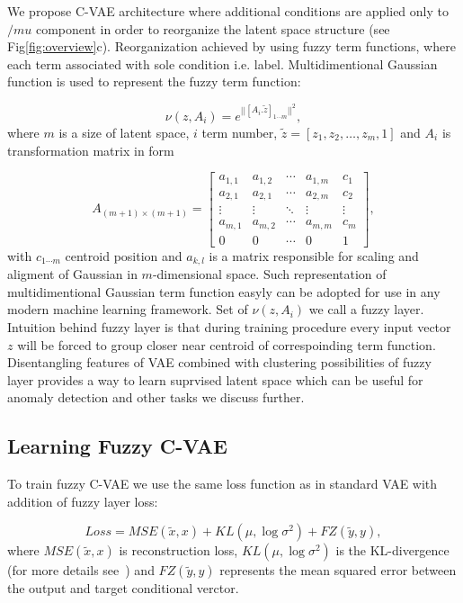 \documentclass[runningheads]{llncs}
\begin{document}
We propose C-VAE architecture where additional conditions are applied only to $/mu$ component in order to reorganize the latent space structure (see Fig\ref{fig:overview}c).
Reorganization achieved by using fuzzy term functions, where each term associated with sole condition i.e. label.
Multidimentional Gaussian function is used to represent the fuzzy term function:

\[ 
   \nu(z, A_i) = e^{|| [A_i . \tilde{z}]_{1 \cdots m} ||^2},
\]
where $m$ is a size of latent space, $i$ \- term number, $\tilde{z} = [z_1, z_2, \ldots, z_m, 1]$ and $A_i$ is transformation matrix in form 

\[ 
    A_{(m+1) \times (m+1)}= 
    \begin{bmatrix}
        a_{1,1} & a_{1,2} & \cdots & a_{1,m} & c_{1}\\
        a_{2,1} & a_{2,1} & \cdots & a_{2,m} & c_{2}\\
        \vdots & \vdots & \ddots & \vdots & \vdots \\
        a_{m,1} & a_{m,2} & \cdots & a_{m,m} & c_{m}\\
        0 & 0 & \cdots & 0 & 1
    \end{bmatrix},
\]
with $c_{1\cdots m}$ centroid position and $a_{k,l}$ is a matrix responsible for scaling and aligment of Gaussian in $m$-dimensional space.
Such representation of multidimentional Gaussian term function easyly can be adopted for use in any modern machine learning framework.
Set of $\nu(z, A_i)$ we call a fuzzy layer.
Intuition behind fuzzy layer is that during training procedure every input vector $z$ will be forced to group closer near centroid of correspoinding term function.
Disentangling features of VAE combined with clustering possibilities of fuzzy layer provides a way to learn suprvised latent space which can be useful for anomaly detection and other tasks we discuss further.

\subsection{Learning Fuzzy C-VAE}

To train fuzzy C-VAE we use the same loss function as in standard VAE with addition of fuzzy layer loss:

\[
    Loss = MSE(\tilde{x}, x) + KL(\mu, \log{\sigma^2}) + FZ(\tilde{y}, y),
\]
where $MSE(\tilde{x}, x)$ is reconstruction loss, $KL(\mu, \log{\sigma^2})$ is the KL-divergence (for more details see~\cite{kingma2022autoencoding}) and $FZ(\tilde{y}, y)$ represents the mean squared error between the output and target conditional verctor.
\end{document}
